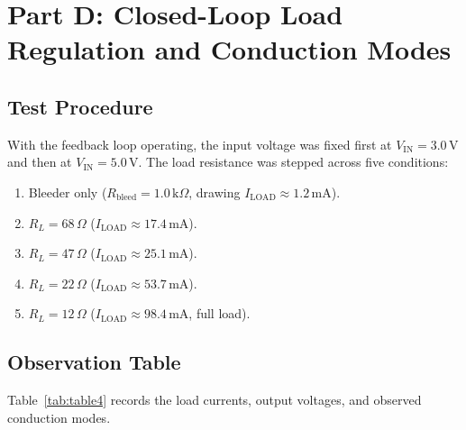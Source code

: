 \documentclass[12pt,a4paper]{article}
\newcommand{\Vin}{V_{\mathrm{IN}}}
\newcommand{\Iload}{I_{\mathrm{LOAD}}}
\begin{document}
\section{Part D: Closed-Loop Load Regulation and Conduction Modes}
\label{sec:part_d}

\subsection{Test Procedure}
With the feedback loop operating, the input voltage was fixed first at $\Vin = 3.0\,\mathrm{V}$ and then at $\Vin = 5.0\,\mathrm{V}$. The load resistance was stepped across five conditions:
\begin{enumerate}
    \item Bleeder only ($R_{\mathrm{bleed}} = 1.0\,\mathrm{k}\Omega$, drawing $\Iload \approx 1.2\,\mathrm{mA}$).
    \item $R_L = 68\,\Omega$ ($\Iload \approx 17.4\,\mathrm{mA}$).
    \item $R_L = 47\,\Omega$ ($\Iload \approx 25.1\,\mathrm{mA}$).
    \item $R_L = 22\,\Omega$ ($\Iload \approx 53.7\,\mathrm{mA}$).
    \item $R_L = 12\,\Omega$ ($\Iload \approx 98.4\,\mathrm{mA}$, full load).
\end{enumerate}

\subsection{Observation Table}
Table~\ref{tab:table4} records the load currents, output voltages, and observed conduction modes.
\end{document}
